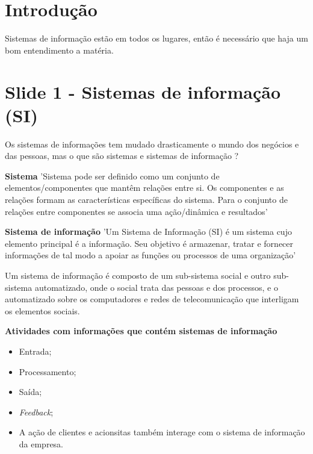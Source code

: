 \documentclass[
	12pt,				%
	openany,			%
	a4paper,			%
	chapter=TITLE,		%
	section=TITLE,		%
	english,
	brazil				%
]{abntex2}
\begin{document}
\imprimircapa

\imprimirfolhaderosto

\tableofcontents

\maketitle

\newpage

\chapter{Introdução}

Sistemas de informação estão em todos os lugares, então é necessário que haja um bom entendimento a matéria.

\chapter{Slide 1 - Sistemas de informação (SI)}



Os sistemas de informações tem mudado drasticamente o mundo dos negócios e das pessoas, mas o que são sistemas e sistemas de informação ?

\textbf{Sistema}
	'Sistema pode ser definido como um conjunto de elementos/componentes que mantêm relações entre si. Os componentes e as relações formam as características específicas do sistema. Para o conjunto de relações entre componentes se associa uma ação/dinâmica e resultados'

\textbf{Sistema de informação}
	'Um Sistema de Informação (SI) é um sistema cujo elemento principal é a informação. Seu objetivo é armazenar, tratar e fornecer informações de tal modo a apoiar as funções ou processos de uma organização'

Um sistema de informação é composto de um sub-sistema social e outro sub-sistema automatizado, onde o social trata das pessoas e dos processos, e o automatizado sobre os computadores e redes de telecomunicação que interligam os elementos sociais.

\textbf{Atividades com informações que contém sistemas de informação}
	\begin{itemize}
		\item Entrada;
		\item Processamento;
		\item Saída;
		\item \textit{Feedback};
		\item A ação de clientes e acionsitas também interage com o sistema de informação da empresa.
	\end{itemize}
\end{document}
